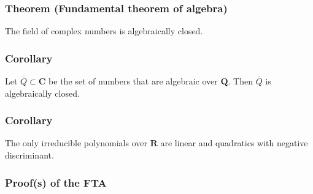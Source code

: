 \documentclass[11pt]{article}
\begin{document}
\subsubsection{Theorem (Fundamental theorem of algebra)}
\label{sec:org2c2fe1f}
The field of complex numbers is algebraically closed.
\subsubsection{Corollary}
\label{sec:orga59193c}
Let \(\overline Q \subset \mathbf{C}\) be the set of numbers that are algebraic over \(\mathbf{Q}\).
Then \(\overline Q\) is algebraically closed.
\subsubsection{Corollary}
\label{sec:org5f61535}
The only irreducible polynomials over \(\mathbf{R}\) are linear and quadratics with negative discriminant.
\subsubsection{Proof(s) of the FTA}
\label{sec:org6917049}
\end{document}
